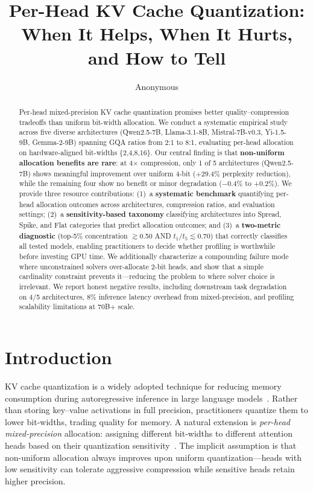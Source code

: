 \documentclass[11pt,a4paper]{article}
\title{Per-Head KV Cache Quantization:\\When It Helps, When It Hurts, and How to Tell}
\author{Anonymous}
\date{}
\begin{document}
\maketitle

\begin{abstract}
Per-head mixed-precision KV cache quantization promises better quality--compression tradeoffs than uniform bit-width allocation.
We conduct a systematic empirical study across five diverse architectures (Qwen2.5-7B, Llama-3.1-8B, Mistral-7B-v0.3, Yi-1.5-9B, Gemma-2-9B) spanning GQA ratios from 2:1 to 8:1, evaluating per-head allocation on hardware-aligned bit-widths \{2,4,8,16\}.
Our central finding is that \textbf{non-uniform allocation benefits are rare}: at 4$\times$ compression, only 1 of 5 architectures (Qwen2.5-7B) shows meaningful improvement over uniform 4-bit (+29.4\% perplexity reduction), while the remaining four show no benefit or minor degradation ($-$0.4\% to +0.2\%).
We provide three resource contributions:
(1)~a \textbf{systematic benchmark} quantifying per-head allocation outcomes across architectures, compression ratios, and evaluation settings;
(2)~a \textbf{sensitivity-based taxonomy} classifying architectures into Spread, Spike, and Flat categories that predict allocation outcomes;
and (3)~a \textbf{two-metric diagnostic} (top-5\% concentration $\gtrsim$0.50 AND $t_1/t_5 \lesssim 0.70$) that correctly classifies all tested models, enabling practitioners to decide whether profiling is worthwhile before investing GPU time.
We additionally characterize a compounding failure mode where unconstrained solvers over-allocate 2-bit heads, and show that a simple cardinality constraint prevents it---reducing the problem to where solver choice is irrelevant.
We report honest negative results, including downstream task degradation on 4/5 architectures, 8\% inference latency overhead from mixed-precision, and profiling scalability limitations at 70B+ scale.
\end{abstract}

\section{Introduction}

KV cache quantization is a widely adopted technique for reducing memory consumption during autoregressive inference in large language models~\cite{hooper2024kvquant,liu2024kivi}.
Rather than storing key--value activations in full precision, practitioners quantize them to lower bit-widths, trading quality for memory.
A natural extension is \emph{per-head mixed-precision} allocation: assigning different bit-widths to different attention heads based on their quantization sensitivity~\cite{zhang2024ratequant}.
The implicit assumption is that non-uniform allocation always improves upon uniform quantization---heads with low sensitivity can tolerate aggressive compression while sensitive heads retain higher precision.
\end{document}
